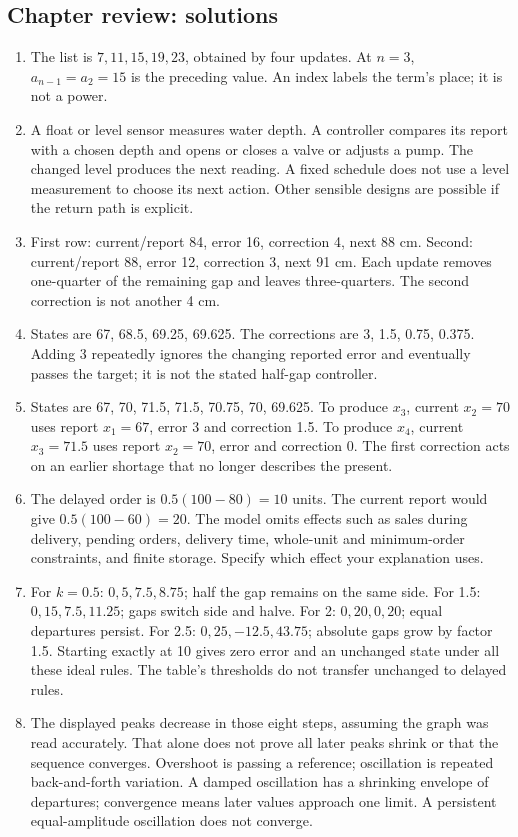 \documentclass[11pt,letterpaper]{article}
\begin{document}
{\subsection*{Chapter review: solutions}
\begin{enumerate}
\item The list is $7,11,15,19,23$, obtained by four updates. At $n=3$, $a_{n-1}=a_2=15$ is the preceding value. An index labels the term's place; it is not a power.
\item A float or level sensor measures water depth. A controller compares its report with a chosen depth and opens or closes a valve or adjusts a pump. The changed level produces the next reading. A fixed schedule does not use a level measurement to choose its next action. Other sensible designs are possible if the return path is explicit.
\item First row: current/report 84, error 16, correction 4, next 88 cm. Second: current/report 88, error 12, correction 3, next 91 cm. Each update removes one-quarter of the remaining gap and leaves three-quarters. The second correction is not another 4 cm.
\item States are 67, 68.5, 69.25, 69.625. The corrections are 3, 1.5, 0.75, 0.375. Adding 3 repeatedly ignores the changing reported error and eventually passes the target; it is not the stated half-gap controller.
\item States are 67, 70, 71.5, 71.5, 70.75, 70, 69.625. To produce $x_3$, current $x_2=70$ uses report $x_1=67$, error 3 and correction 1.5. To produce $x_4$, current $x_3=71.5$ uses report $x_2=70$, error and correction 0. The first correction acts on an earlier shortage that no longer describes the present.
\item The delayed order is $0.5(100-80)=10$ units. The current report would give $0.5(100-60)=20$. The model omits effects such as sales during delivery, pending orders, delivery time, whole-unit and minimum-order constraints, and finite storage. Specify which effect your explanation uses.
\item For $k=0.5$: $0,5,7.5,8.75$; half the gap remains on the same side. For 1.5: $0,15,7.5,11.25$; gaps switch side and halve. For 2: $0,20,0,20$; equal departures persist. For 2.5: $0,25,-12.5,43.75$; absolute gaps grow by factor 1.5. Starting exactly at 10 gives zero error and an unchanged state under all these ideal rules. The table's thresholds do not transfer unchanged to delayed rules.
\item The displayed peaks decrease in those eight steps, assuming the graph was read accurately. That alone does not prove all later peaks shrink or that the sequence converges. Overshoot is passing a reference; oscillation is repeated back-and-forth variation. A damped oscillation has a shrinking envelope of departures; convergence means later values approach one limit. A persistent equal-amplitude oscillation does not converge.

\end{enumerate}}
\end{document}
